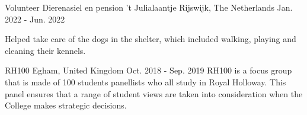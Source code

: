 \begin{cventries}
  \cventry
  {Volunteer}
  {Dierenasiel en pension 't Julialaantje}
  {Rijswijk, The Netherlands}
  {Jan. 2022 - Jun. 2022}
  {
    \begin{cvitems}
      \item {Helped take care of the dogs in the shelter, which included walking, playing and cleaning their kennels.}
    \end{cvitems}
  }
  {RH100}
  {Egham, United Kingdom}
  {Oct. 2018 - Sep. 2019}
  {RH100 is a focus group that is made of 100 students panellists who all study in Royal Holloway. This panel ensures that a range of student views are taken into consideration when the College makes strategic decisions.}

\end{cventries}